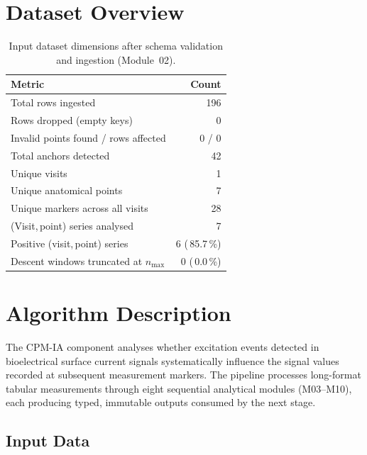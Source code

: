 \documentclass[a4paper,11pt]{article}
\begin{document}
\section{Dataset Overview}

\begin{table}[h!]
\centering
\small
\caption{Input dataset dimensions after schema validation and ingestion (Module~02).}
\begin{tabular}{lr}
\toprule
\textbf{Metric} & \textbf{Count} \\
\midrule
Total rows ingested                        & 196 \\
Rows dropped (empty keys)                  & 0 \\
Invalid points found / rows affected       & 0 / 0 \\
Total anchors detected                     & 42 \\
Unique visits                          & 1 \\
Unique anatomical points               & 7 \\
Unique markers across all visits       & 28 \\
(Visit,\,point) series analysed        & 7 \\
Positive (visit,\,point) series        & 6 (\,85.7\,\%) \\
Descent windows truncated at $n_{\max}$ & 0 (\,0.0\,\%) \\
\bottomrule
\end{tabular}
\end{table}

\section{Algorithm Description}

The CPM-IA component analyses whether excitation events detected in bioelectrical surface
current signals systematically influence the signal values recorded at subsequent measurement
markers. The pipeline processes long-format tabular measurements through eight sequential
analytical modules (M03--M10), each producing typed, immutable outputs consumed by the next
stage.

\subsection{Input Data}
\end{document}
